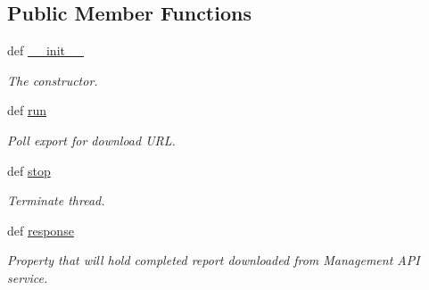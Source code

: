 \subsection*{Public Member Functions}
\begin{DoxyCompactItemize}
\item 
def \hyperlink{classtune_1_1management_1_1reports_1_1report__export__worker_1_1ReportExportWorker_a499f66d898085a548f1ac4fbe7987751}{\-\_\-\-\_\-init\-\_\-\-\_\-}
\begin{DoxyCompactList}\small\item\em The constructor. \end{DoxyCompactList}\item 
def \hyperlink{classtune_1_1management_1_1reports_1_1report__export__worker_1_1ReportExportWorker_a44d3b02f06bbe340a4311e84a28055ac}{run}
\begin{DoxyCompactList}\small\item\em Poll export for download U\-R\-L. \end{DoxyCompactList}\item 
def \hyperlink{classtune_1_1management_1_1reports_1_1report__export__worker_1_1ReportExportWorker_a448cbf72ff829120b72294d038025548}{stop}
\begin{DoxyCompactList}\small\item\em Terminate thread. \end{DoxyCompactList}\item 
def \hyperlink{classtune_1_1management_1_1reports_1_1report__export__worker_1_1ReportExportWorker_ab802b6d34e51728b8fce42fc8910a02c}{response}
\begin{DoxyCompactList}\small\item\em Property that will hold completed report downloaded from Management A\-P\-I service. \end{DoxyCompactList}\end{DoxyCompactItemize}
